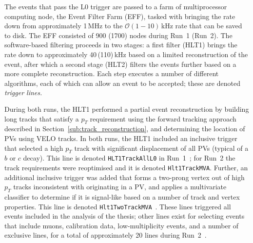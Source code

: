 The events that pass the L0 trigger are passed to a farm of multiprocessor computing node, the Event Filter Farm (EFF), tasked with bringing the rate down from approximately 1\,MHz to the $\mathcal O(1-10)$\,kHz rate that can be saved to disk. The EFF consisted of 900 (1700) nodes during Run~1 (Run~2). The software-based filtering proceeds in two stages: a first filter (HLT1) brings the rate down to approximately 40\,(110)\,kHz based on a limited reconstruction of the event,  after which a second stage  (HLT2) filters the events further based on a more complete reconstruction. Each step executes a number of different algorithms, each of which can allow an event to be accepted; these are denoted \emph{trigger lines.}

During both runs, the HLT1 performed a partial event reconstruction by building long tracks that satisfy a $p_T$ requirement using the forward tracking approach described in Section~\ref{sub:track_reconstruction}, and determining the location of PVs using VELO tracks. In both runs, the HLT1 included an inclusive trigger that selected a high $p_T$ track with significant displacement of all PVs (typical of a $b$ or $c$ decay). This line is denoted \texttt{HLT1TrackAllL0} in Run~1~\cite{Trigger-Performance}; for Run~2 the track requirements were reoptimised and it is denoted \texttt{Hlt1TrackMVA}. Further, an additional inclusive trigger was added that forms a two-prong vertex out of high $p_T$ tracks inconsistent with originating in a PV, and applies a multivariate classifier to determine if it is signal-like based on a number of track and vertex properties. This line is denoted \texttt{Hlt1TwoTrackMVA}~\cite{Trigger-Performance2}. These lines triggered all events included in the analysis of the thesis; other lines exist for selecting events that include muons, calibration data, low-multiplicity events, and a number of exclusive lines, for a total of approximately 20 lines during Run~2~\cite{Trigger-Performance2}.

